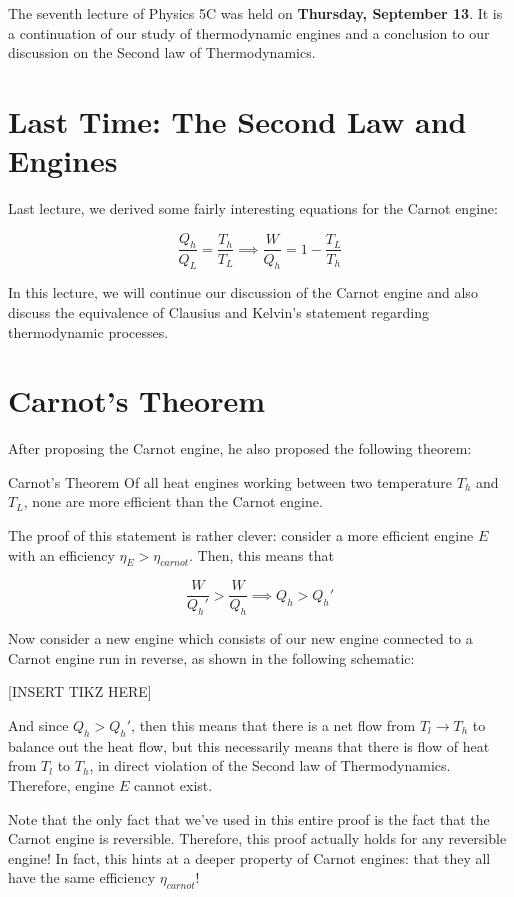 The seventh lecture of Physics 5C was held on  \textbf{Thursday, September 13}. It is a continuation of our study of thermodynamic engines and a conclusion to our discussion on the Second law of Thermodynamics.

    \section{Last Time: The Second Law and Engines}

    Last lecture, we derived some fairly interesting equations for the Carnot engine: 

    \[ \frac{Q_h}{Q_L} = \frac{T_h}{T_L} \implies \frac{W}{Q_h} = 1 - \frac{T_L}{T_h}\] 

    In this lecture, we will continue our discussion of the Carnot engine and also discuss the equivalence of Clausius and Kelvin's statement regarding thermodynamic processes.

    \section{Carnot's Theorem}

    After proposing the Carnot engine, he also proposed the following theorem: 

    \begin{theorem}{Carnot's Theorem}{}
      Of all heat engines working between two temperature $T_h$ and $T_L$, none are more efficient than the Carnot engine.
    \end{theorem}

    The proof of this statement is rather clever: consider a more efficient engine $E$ with an efficiency $\eta_E > \eta_{carnot}$. Then, this means that 

    \[ \frac{W}{Q_h'} > \frac{W}{Q_h} \implies Q_h > Q_h'\]

    Now consider a new engine which consists of our new engine connected to a Carnot engine run in reverse, as shown in the following schematic: 

    [INSERT TIKZ HERE]

    And since $Q_h > Q_h'$, then this means that there is a net flow from $T_l \to T_h$ to balance out the heat flow, but this necessarily means that there is flow of heat from $T_l$ to $T_h$, in direct violation of the Second law of Thermodynamics. Therefore, engine $E$ cannot exist.

    \begin{insight*}{}
      Note that the only fact that we've used in this entire proof is the fact that the Carnot engine is reversible. Therefore, this proof actually holds for any reversible engine! In fact, this hints at a deeper property of Carnot engines: that they all have the same efficiency $\eta_{carnot}$! 
    \end{insight*}

